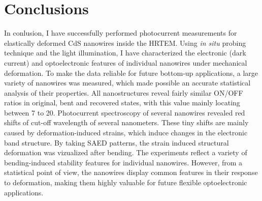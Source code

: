 \section{Conclusions}
In conlusion, I have successfully performed photocurrent measurements for elastically deformed CdS nanowires inside the HRTEM. Using {\em in situ}  probing technique and the light illumination, I have characterized the electronic (dark current) and optoelectronic features of individual nanowires under mechanical deformation. 
To make the data reliable for future bottom-up applications, a large variety of nanowires was measured, which made possible an accurate statistical analysis of their properties. 
All nanostructures reveal fairly similar ON/OFF ratios in original, bent and recovered states, with this value mainly locating between 7 to 20. 
Photocurrent spectroscopy of several nanowires revealed red shifts of cut-off wavelength of several nanometers. 
These tiny shifts are mainly caused by deformation-induced strains, which induce changes in the electronic band structure. 
By taking SAED patterns, the strain induced structural deformation was vizualized after bending. 
The experiments reflect a variety of bending-induced stability features for individual nanowires. However, from a statistical point of view, the nanowires display common features in their response to deformation, making them highly valuable for future flexible optoelectronic applications. 

